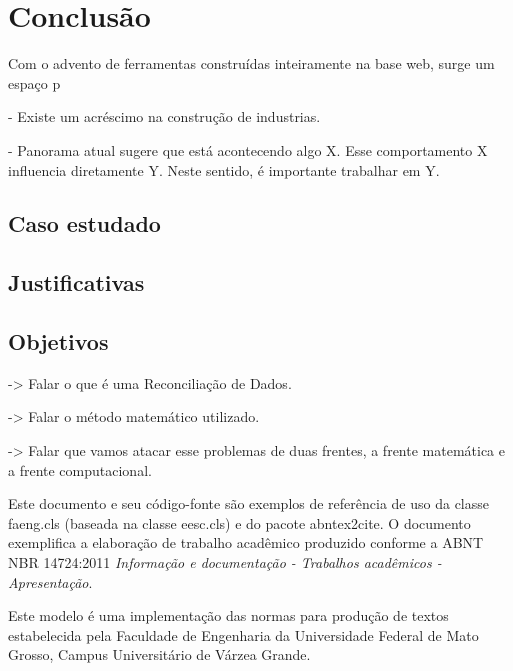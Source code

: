 \chapter[Conclusão]{Conclusão}

Com o advento de ferramentas construídas inteiramente na base web, surge um espaço p


- Existe um acréscimo na construção de industrias.


- Panorama atual sugere que está acontecendo algo X. Esse comportamento X influencia diretamente Y. Neste sentido, é importante trabalhar em Y.


\section{Caso estudado}


\section{Justificativas}


\section{Objetivos}

-> Falar o que é uma Reconciliação de Dados.

-> Falar o método matemático utilizado.

-> Falar que vamos atacar esse problemas de duas frentes, a frente matemática e a frente computacional.

Este documento e seu código-fonte são exemplos de referência de uso da classe \textsf{faeng.cls} (baseada na classe \textsf{eesc.cls}) e do pacote \textsf{abntex2cite}. O documento exemplifica a elaboração de trabalho acadêmico produzido conforme a \ac{ABNT} \ac{NBR} 14724:2011 \emph{Informação e documentação - Trabalhos acadêmicos - Apresentação}.

Este modelo é uma implementação das normas para produção de textos estabelecida pela Faculdade de Engenharia da Universidade Federal de Mato Grosso, Campus Universitário de Várzea Grande.